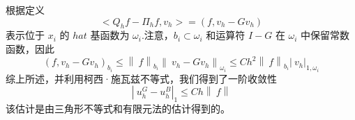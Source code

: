 \documentclass[12pt,a4paper]{article}
\begin{document}
根据定义
$$
<Q_h f-\Pi_h f,v_h>=(f,v_h-Gv_h)
$$
表示位于 $x_i$ 的 $hat$ 基函数为 $\omega _i$.注意，$b_i\subset ω_i$ 和运算符 $I-G$ 在 $\omega _i$ 中保留常数函数，因此 
$$
(f,v_h-Gv_h)_{b_i}\le \left \| \ f\right \|_{b_i}\left \| \ v_h-Gv_h\right \|_{\omega _i}\le Ch^2\left \| \ f \right \|_{b_i}\left|\ v_h \right|_{1,\omega _i}
$$
综上所述，并利用柯西·施瓦兹不等式，我们得到了一阶收敛性
$$
\left|\ u^G_h-u^B_h \right|_1\le Ch\left \|\ f \right \|
$$
该估计是由三角形不等式和有限元法的估计得到的。










%

%
\end{document}
